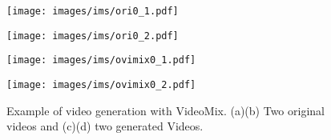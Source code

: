 \begin{figure}[t]
    \centering


    \begin{minipage}[t]{0.9\linewidth}
    \centering
    \texttt{[image: images/ims/ori0\_1.pdf]}
    \subcaption{}
    \label{fig:ovmixbase1}
    \end{minipage}
    \vspace{0.5em}

    \begin{minipage}[t]{0.9\linewidth}
    \centering
    \texttt{[image: images/ims/ori0\_2.pdf]}
    \subcaption{}
    \label{fig:ovmixbase2}
    \end{minipage}
    \vspace{0.5em}
    
    \begin{minipage}[t]{0.9\linewidth}
    \centering
    \texttt{[image: images/ims/ovimix0\_1.pdf]}
    \subcaption{}
    \label{fig:ovmix1}
    \end{minipage}
    \vspace{0.5em}

    \begin{minipage}[t]{0.9\linewidth}
    \centering
    \texttt{[image: images/ims/ovimix0\_2.pdf]}
    \subcaption{}
    \label{fig:ovmix2}
    \end{minipage}


    \caption{
    Example of video generation with VideoMix.
    (a)(b) Two original videos and
    (c)(d) two generated Videos.
    }

    \label{fig:VideoMix}
\end{figure}

